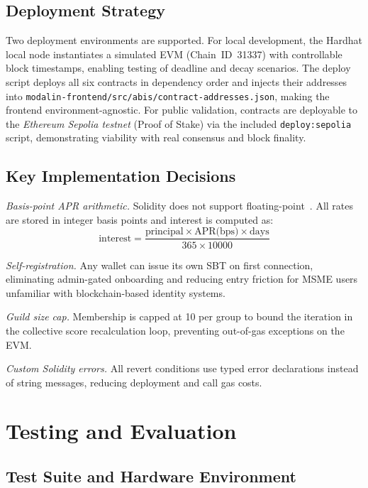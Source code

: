 \documentclass[conference]{IEEEtran}
\begin{document}
\subsection{Deployment Strategy}

Two deployment environments are supported. For local development,
the Hardhat local node instantiates a simulated EVM (Chain~ID~31337) with
controllable block timestamps, enabling testing of deadline and decay
scenarios. The deploy script deploys all six contracts in dependency order and
injects their addresses into
\texttt{modalin-frontend/src/abis/contract-addresses.json}, making the
frontend environment-agnostic. For public validation, contracts are deployable
to the \textit{Ethereum Sepolia testnet} (Proof of Stake) via the included
\texttt{deploy:sepolia} script, demonstrating viability with real consensus
and block finality.

\subsection{Key Implementation Decisions}

\textit{Basis-point APR arithmetic.} Solidity does not support
floating-point~\cite{b8,b24}. All rates are stored in integer basis points
and interest is computed as:
\[
  \text{interest} =
  \frac{\text{principal} \times \text{APR(bps)} \times \text{days}}
       {365 \times 10000}
\]

\textit{Self-registration.} Any wallet can issue its own SBT on first
connection, eliminating admin-gated onboarding and reducing entry friction for
MSME users unfamiliar with blockchain-based identity systems.

\textit{Guild size cap.} Membership is capped at 10 per group to bound the
iteration in the collective score recalculation loop, preventing out-of-gas
exceptions on the EVM.

\textit{Custom Solidity errors.} All revert conditions use typed error
declarations instead of string messages, reducing deployment and call gas
costs.

\section{Testing and Evaluation}

\subsection{Test Suite and Hardware Environment}
\end{document}
